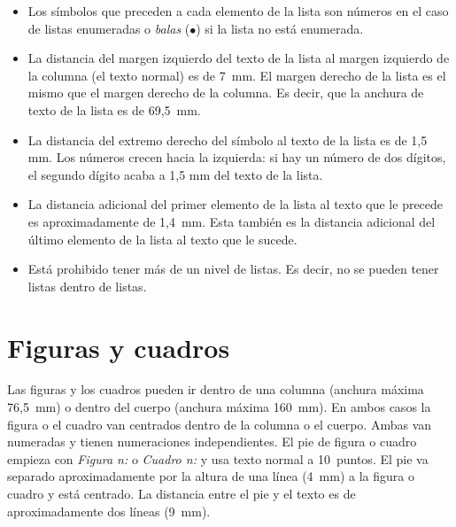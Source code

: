 \documentclass[twocolumn,twoside,a4paper, 10pt]{article}
\begin{document}
\begin{itemize}
	\item Los símbolos que preceden a cada elemento de la lista son 
	números en el caso de listas enumeradas o \emph{balas} 
	($\bullet$) si la lista no está enumerada.
	
	\item La distancia del margen izquierdo del texto de la lista al
	margen izquierdo de la columna (el texto normal) es de 7~mm.  El
	margen derecho de la lista es el mismo que el margen derecho de la
	columna. Es decir, que la anchura de texto de la lista es de 69,5~mm.
	
	\item La distancia del extremo derecho del símbolo al texto de la 
	lista es de 1,5 mm. Los números crecen hacia la izquierda: si hay 
	un número de dos dígitos, el segundo dígito acaba a 1,5 mm del 
	texto de la lista.
	
	\item La distancia adicional del primer elemento de la lista al texto que 
	le precede es aproximadamente de 1,4~mm. Esta también es la distancia adicional del último 
	elemento de la lista al texto que le sucede.
	
	\item Está prohibido tener más de un nivel de 
	listas. Es decir, no se pueden tener listas dentro de listas.
\end{itemize}

\section{Figuras y cuadros}

Las figuras y los cuadros pueden ir dentro de una columna (anchura 
máxima 76,5~mm) o dentro del cuerpo (anchura máxima 160~mm). En ambos 
casos la figura o el cuadro van centrados dentro de la columna o el 
cuerpo. Ambas van numeradas y tienen numeraciones independientes. El 
pie de figura o cuadro empieza con \emph{Figura n:} o \emph{Cuadro 
n:} y usa texto normal a 10~puntos. El pie  va separado 
aproximadamente por la altura de una línea (4~mm) a la figura o 
cuadro y está centrado. La distancia entre el pie y el texto es de 
aproximadamente dos líneas (9~mm).
\end{document}
